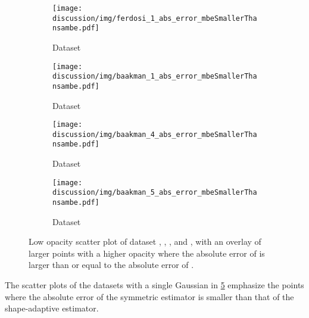 
\begin{figure}
	\centering
	\begin{subfigure}{0.23\textwidth}
		\centering
		\texttt{[image: discussion/img/ferdosi\_1\_abs\_error\_mbeSmallerThansambe.pdf]}
		\caption{Dataset \ferdosiOne}
		\label{fig:discussion:singleSphere:mbeLowerError:ferdosi1}
	\end{subfigure}
	\begin{subfigure}{0.23\textwidth}
		\centering
		\texttt{[image: discussion/img/baakman\_1\_abs\_error\_mbeSmallerThansambe.pdf]}
		\caption{Dataset \baakmanOne}
		\label{fig:discussion:singleSphere:mbeLowerError:baakman1}
	\end{subfigure}	
	\begin{subfigure}{0.23\textwidth}
		\centering
		\texttt{[image: discussion/img/baakman\_4\_abs\_error\_mbeSmallerThansambe.pdf]}
		\caption{Dataset \baakmanFour}
		\label{fig:discussion:singleSphere:mbeLowerError:baakman4}
	\end{subfigure}		
	\begin{subfigure}{0.23\textwidth}
		\centering
		\texttt{[image: discussion/img/baakman\_5\_abs\_error\_mbeSmallerThansambe.pdf]}
		\caption{Dataset \baakmanFive}
		\label{fig:discussion:singleSphere:mbeLowerError:baakman5}
	\end{subfigure}			
	\caption{Low opacity scatter plot of dataset %
		 \ferdosiOne, %
		 \baakmanOne, %
		 \baakmanFour, and%
		 \baakmanFive, %
		with an overlay of larger points with a higher opacity where the absolute error of \sambe is larger than or equal to the absolute error of \mbe.}
	\label{fig:discussion:singleSphere:mbeLowerError}
\end{figure}

The scatter plots of the datasets with a single Gaussian in \cref{fig:discussion:singleSphere:mbeLowerError} emphasize the points where the absolute error of the symmetric estimator is smaller than that of the shape-adaptive estimator. 

